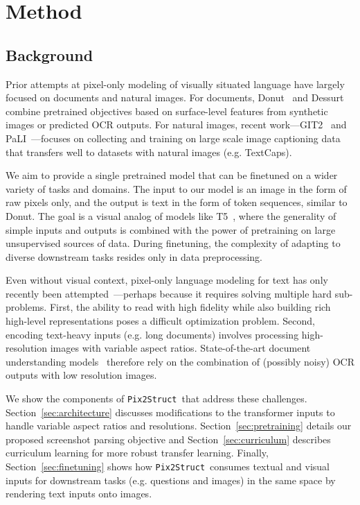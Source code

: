 \documentclass{article} %
\newcommand\ourmodel{{\texttt{Pix2Struct}}}
\begin{document}
\section{Method}
\subsection{Background} 
Prior attempts at pixel-only modeling of visually situated language have largely focused on documents and natural images. For documents, Donut~\citep{donut} and Dessurt~\citep{dessurt} combine pretrained objectives based on surface-level features from synthetic images or predicted OCR outputs. For natural images, recent work---GIT2~\citep{wang2022git} and PaLI~\citep{pali}---focuses on collecting and training on large scale image captioning data that transfers well to datasets with natural images (e.g. TextCaps). 

We aim to provide a single pretrained model that can be finetuned on a wider variety of tasks and domains. The input to our model is an image in the form of raw pixels only, and the output is text in the form of token sequences, similar to Donut. The goal is a visual analog of models like T5~\citep{t5}, where the generality of simple inputs and outputs is combined with the power of pretraining on large unsupervised sources of data. During finetuning, the complexity of adapting to diverse downstream tasks resides only in data preprocessing.

Even without visual context, pixel-only language modeling for text has only recently been attempted~\citep{rust2022language}---perhaps because it requires solving multiple hard sub-problems. First, the ability to read with high fidelity while also building rich high-level representations poses a difficult optimization problem. Second, encoding text-heavy inputs (e.g. long documents) involves processing high-resolution images with variable aspect ratios. State-of-the-art document understanding models~\citep{layoutlmv3} therefore rely on the combination of (possibly noisy) OCR outputs with low resolution images. 

We show the components of \ourmodel~that address these challenges. Section~\ref{sec:architecture} discusses modifications to the transformer inputs to handle variable aspect ratios and resolutions. Section~\ref{sec:pretraining} details our proposed screenshot parsing objective and Section~\ref{sec:curriculum} describes curriculum learning for  more robust transfer learning. Finally, Section~\ref{sec:finetuning} shows how \ourmodel~consumes textual and visual inputs for downstream tasks (e.g. questions and images) in the same space by rendering text inputs onto images. 
\end{document}
